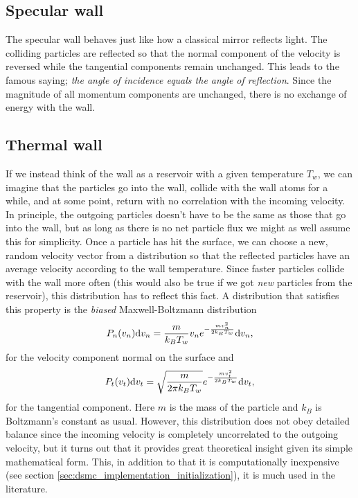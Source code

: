 \subsection{Specular wall}
The specular wall behaves just like how a classical mirror reflects light. The colliding particles are reflected so that the normal component of the velocity is reversed while the tangential components remain unchanged. This leads to the famous saying; \textit{the angle of incidence equals the angle of reflection}. Since the magnitude of all momentum components are unchanged, there is no exchange of energy with the wall. 

\subsection{Thermal wall}
If we instead think of the wall as a reservoir with a given temperature $T_w$, we can imagine that the particles go into the wall, collide with the wall atoms for a while, and at some point, return with no correlation with the incoming velocity. In principle, the outgoing particles doesn't have to be the same as those that go into the wall, but as long as there is no net particle flux we might as well assume this for simplicity. Once a particle has hit the surface, we can choose a new, random velocity vector from a distribution so that the reflected particles have an average velocity according to the wall temperature. Since faster particles collide with the wall more often (this would also be true if we got \textit{new} particles from the reservoir), this distribution has to reflect this fact. A distribution that satisfies this property is the \textit{biased} Maxwell-Boltzmann distribution\cite{alexander1997direct} 
\begin{align}
	P_n(v_n)\mathrm{d}v_n = {m\over k_BT_w}v_n e^{-\frac{mv_n^2}{2k_BT_w}} \mathrm{d}v_n,
\end{align}
for the velocity component normal on the surface and
\begin{align}
	P_t(v_t)\mathrm{d}v_t = \sqrt{m\over 2\pi k_BT_w}e^{-\frac{mv_t^2}{2k_BT_w}} \mathrm{d}v_t,
\end{align}
for the tangential component. Here $m$ is the mass of the particle and $k_B$ is Boltzmann's constant as usual. However, this distribution does not obey detailed balance since the incoming velocity is completely uncorrelated to the outgoing velocity, but it turns out that it provides great theoretical insight given its simple mathematical form. This, in addition to that it is computationally inexpensive (see section \ref{sec:dsmc_implementation_initialization}), it is much used in the literature. 

